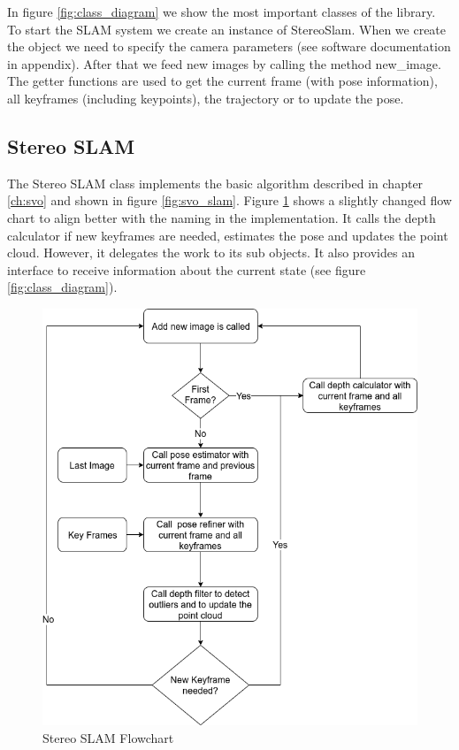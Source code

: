 \documentclass[11pt,a4paper,titlepage,oneside]{report}
\begin{document}
In figure \ref{fig:class_diagram} we show the most important classes of the library. To start the SLAM system we create an instance of StereoSlam. When we create the object we need to specify the camera parameters (see software documentation in appendix). After that we feed new images by calling the method new\_image. The getter functions are used to get the current frame (with pose information), all keyframes (including keypoints), the trajectory or to update the pose.

\subsection{Stereo SLAM}

The Stereo SLAM class implements the basic algorithm described in chapter \ref{ch:svo} and shown in figure \ref{fig:svo_slam}. Figure \ref{fig:flow_stereo_slam} shows a slightly changed flow chart to align better with the naming in the implementation. It calls the depth calculator if new keyframes are needed, estimates the pose and updates the point cloud. However, it delegates the work to its sub objects. It also provides an interface to receive information about the current state (see figure \ref{fig:class_diagram}).

\begin{figure}[H]
  \centering
  \includegraphics[scale=0.3]{img/flow_stereo_slam.png}
  \caption{Stereo SLAM Flowchart}\label{fig:flow_stereo_slam}
\end{figure}
\end{document}
